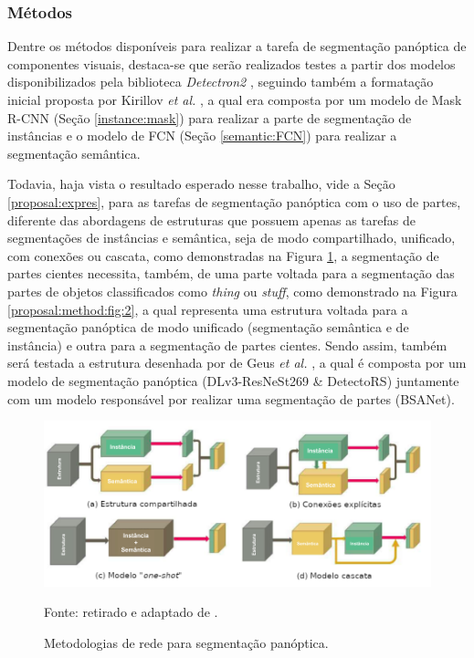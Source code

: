 \subsubsection{Métodos}
\label{proposal:method}
Dentre os métodos disponíveis para realizar a tarefa de segmentação panóptica de componentes visuais, destaca-se que serão realizados testes a partir dos modelos disponibilizados pela biblioteca \textit{Detectron2} \cite{detectron2}, seguindo também a formatação inicial proposta por Kirillov \textit{et al.} \cite{Kirillov2019a}, a qual era composta por um modelo de Mask R-CNN (Seção \ref{instance:mask}) para realizar a parte de segmentação de instâncias e o modelo de FCN (Seção \ref{semantic:FCN}) para realizar a segmentação semântica.

Todavia, haja vista o resultado esperado nesse trabalho, vide a Seção \ref{proposal:expres}, para as tarefas de segmentação panóptica com o uso de partes, diferente das abordagens de estruturas que possuem apenas as tarefas de segmentações de instâncias e semântica, seja de modo compartilhado, unificado, com conexões ou cascata, como demonstradas na Figura \ref{proposal:method:fig:1}, a segmentação de partes cientes necessita, também, de uma parte voltada para a segmentação das partes de objetos classificados como \textit{thing} ou \textit{stuff}, como demonstrado na Figura \ref{proposal:method:fig:2}, a qual representa uma estrutura voltada para a segmentação panóptica de modo unificado (segmentação semântica e de instância) e outra para a segmentação de partes cientes. Sendo assim, também será testada a estrutura desenhada por de Geus \textit{et al.} \cite{DeGeus2021}, a qual é composta por um modelo de segmentação panóptica (DLv3-ResNeSt269 \& DetectoRS) juntamente com um modelo responsável por realizar uma segmentação de partes (BSANet).

\begin{figure}[H]
    \centering
    \caption{Metodologias de rede para segmentação panóptica.}
    \includegraphics[width=1\textwidth]{recursos/imagens/proposal/model_methodologies.png}
    \label{proposal:method:fig:1}

    Fonte: retirado e adaptado de \cite{Elharrouss2021}.
\end{figure}

